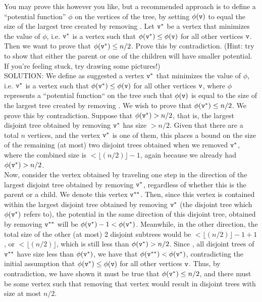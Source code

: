 \documentclass[11pt]{article}
\begin{document}
\begin{enumerate}
\begin{enumerate}
  You may prove this however you like, but a recommended approach is to define a ``potential function'' $\phi$ on the vertices of the tree, by setting $\phi(\texttt{v})$ to equal the size of the largest tree created by removing \btv.  Let $\texttt{v}^*$ be a vertex that minimizes the value of $\phi$, i.e. $\texttt{v}^*$ is a vertex such that $\phi(\texttt{v}^*) \le \phi(\texttt{v})$ for all other vertices $\texttt{v}$. Then we want to prove that $\phi(\texttt{v}^*)\leq n/2$.  Prove this by contradiction.  (Hint: try to show that either the parent or one of the children will have smaller potential. If you're feeling stuck, try drawing some pictures!) \\
  
  SOLUTION: We define as suggested a vertex $\texttt{v}^*$ that minimizes the value of $\phi$, i.e. $\texttt{v}^*$ is a vertex such that $\phi(\texttt{v}^*) \le \phi(\texttt{v})$ for all other vertices $\texttt{v}$, where $\phi$ represents a ``potential function`` on the tree such that $\phi(\texttt{v})$ is equal to the size of the largest tree created by removing \btv. We wish to prove that  $\phi(\texttt{v}^*)\leq n/2$. We prove this by contradiction. Suppose that $\phi(\texttt{v}^*) > n/2$, that is, the largest disjoint tree obtained by removing $\texttt{v}^*$ has size $ > n/2$. Given that there are a total $n$ vertices, and the vertex $\texttt{v}^*$ is one of them, this places a bound on the size of the remaining (at most) two disjoint trees obtained when we removed $\texttt{v}^*$, where the combined size is $ < \lfloor(n/2)\rfloor - 1$, again because we already had $\phi(\texttt{v}^*) > n/2$. \\
  
  Now, consider the vertex obtained by traveling one step in the direction of the largest disjoint tree obtained by removing $\texttt{v}^*$, regardless of whether this is the parent or a child. We denote this vertex $\texttt{v}^{**}$. Then, since this vertex is contained within the largest disjoint tree obtained by removing $\texttt{v}^*$ (the disjoint tree which $\phi(\texttt{v}^*)$ refers to), the potential in the same direction of this disjoint tree, obtained by removing $\texttt{v}^{**}$ will be $\phi(\texttt{v}^*) - 1 < \phi(\texttt{v}^*)$. Meanwhile, in the other direction, the total size of the other (at most) 2 disjoint subtrees would be $ < \lfloor(n/2)\rfloor - 1 + 1$, or $ < \lfloor(n/2)\rfloor$, which is still less than $\phi(\texttt{v}^*) > n/2$. Since , all disjoint trees of $\texttt{v}^{**}$ have size less than $\phi(\texttt{v}^*)$, we have that $\phi(\texttt{v}^{**}) < \phi(\texttt{v}^*)$, contradicting the initial assumption that $\phi(\texttt{v}^*) \le \phi(\texttt{v})$ for all other vertices $\texttt{v}$. Thus, by contradiction, we have shown it must be true that $\phi(\texttt{v}^*)\leq n/2$, and there must be some vertex such that removing that vertex would result in disjoint trees with size at most $n/2$. \\
 

\end{enumerate}
\end{enumerate}
\end{document}
